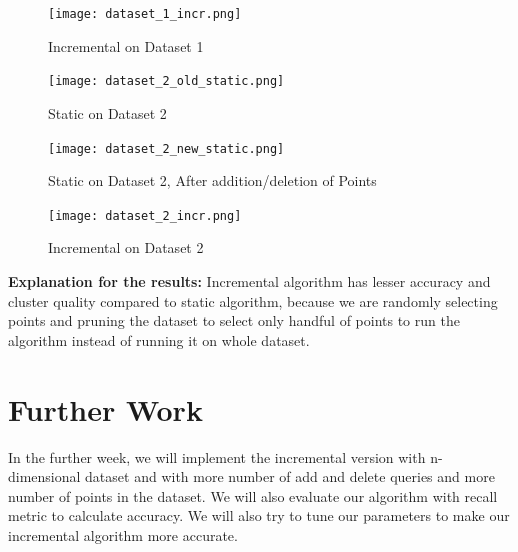 \documentclass[acmsmall]{acmart}
\begin{document}
\begin{enumerate}
            \begin{figure} [H]
                \texttt{[image: dataset\_1\_incr.png]}
                \caption{Incremental on Dataset 1} 
            \end{figure}
                    
            \begin{figure} [H]
                \texttt{[image: dataset\_2\_old\_static.png]}
                \caption{Static on Dataset 2} 
            \end{figure}
            
            \begin{figure} [H]
                \texttt{[image: dataset\_2\_new\_static.png]}
                \caption{Static on Dataset 2, After addition/deletion of Points} 
            \end{figure}
            
            \begin{figure} [H]
                \texttt{[image: dataset\_2\_incr.png]}
                \caption{Incremental on Dataset 2} 
            \end{figure}
                
            \textbf{Explanation for the results: } Incremental algorithm has lesser accuracy and cluster quality compared to static algorithm, because we are randomly selecting points and pruning the dataset to select only handful of points to run the algorithm instead of running it on whole dataset.
\end{enumerate}

\section*{Further Work}
In the further week, we will implement the incremental version with n-dimensional dataset and with more number of add and delete queries and more number of points in the dataset. We will also evaluate our algorithm with recall metric to calculate accuracy. We will also try to tune our parameters to make our incremental algorithm more accurate.
\end{document}
